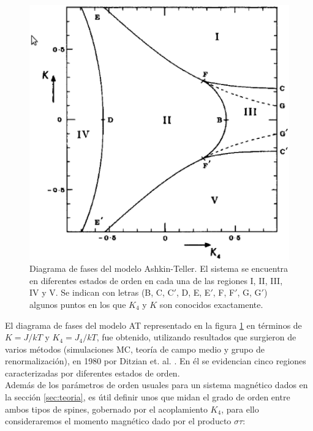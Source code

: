 \begin{figure}[h!]
\begin{center}
\includegraphics[scale=0.65]{graf/phases/AT_ph_diag_Baxter.eps}
\end{center}
\caption{Diagrama de fases del modelo Ashkin-Teller. El sistema se encuentra en diferentes estados de orden en cada una de las regiones I, II, III, IV y V.
 Se indican con letras (B, C, C$'$, D, E, E$'$, F, F$'$, G, G$'$) algunos puntos en los que $K_{4}$ y $K$ son conocidos exactamente.}
\label{fig:AT_ph_diag_Baxter}
\end{figure}

El diagrama de fases del modelo AT representado en la figura \ref{fig:AT_ph_diag_Baxter} en t\'erminos de $K=J/kT$ y $K_{4}=J_{4}/kT$,
 fue obtenido, utilizando resultados que surgieron de varios métodos (simulaciones MC, teoría de campo medio y grupo de renormalización),
 en 1980 por Ditzian et. al. \cite{AT_3D_phdiag}. En él se evidencian cinco regiones caracterizadas por diferentes estados de orden.\\
Además de los parámetros de orden usuales para un sistema magnético dados en la sección \ref{sec:teoria}, es útil definir unos que midan el grado de orden entre
ambos tipos de spines, gobernado por el acoplamiento $K_{4}$, para ello consideraremos el momento magnético dado por el producto $\sigma\tau$:

